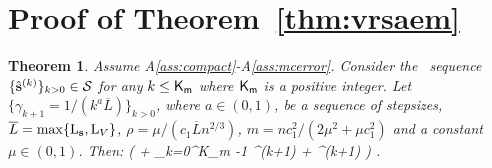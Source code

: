 \documentclass[11pt]{article}
\newtheorem*{Theorem*}{Theorem}
\theoremstyle{t}
\begin{document}
\clearpage

\section{Proof of Theorem~\ref{thm:vrsaem}}\label{app:theoremvrsaem}
\begin{Theorem*}
Assume A\ref{ass:compact}-A\ref{ass:mcerror}.
Consider the \SAEMVR\ sequence $\{\hat{\bss}^{(k)}\}_{k>0} \in \mathcal{S}$ for any $k \leq {\sf K}_{\sf m }$ where ${\sf K}_{\sf m }$ is a positive integer. 
Let $\{\gamma_{k+1} = 1/(k^a \overline{L})\}_{k>0}$, where $a \in (0,1)$, be a sequence of stepsizes, $\overline{L} = \max \{\Lip{\bss}, \Lip{V} \}$, $\rho = \mu/( c_1 \overline{L}  n^{2/3})$, $m = n c_1^2/(2 \mu^2+\mu c_1^2)$ and a constant $\mu \in (0,1)$. Then:
\beq\notag
\EE[ \| \grd V( \hs{K} ) \|^2 ] \leq  {}\left( \EE[ \Delta V ]+  \sum_{k=0}^{{\sf K}_{\sf m }-1}  \tilde{\eta}^{(k+1)}\hspace{-0.1cm} + \chi^{(k+1)} \EE[\| \hs{k} - \tilde{S}^{(k)}\|^2]\right)  \eqsp.
\eeq
\end{Theorem*} 
\end{document}

